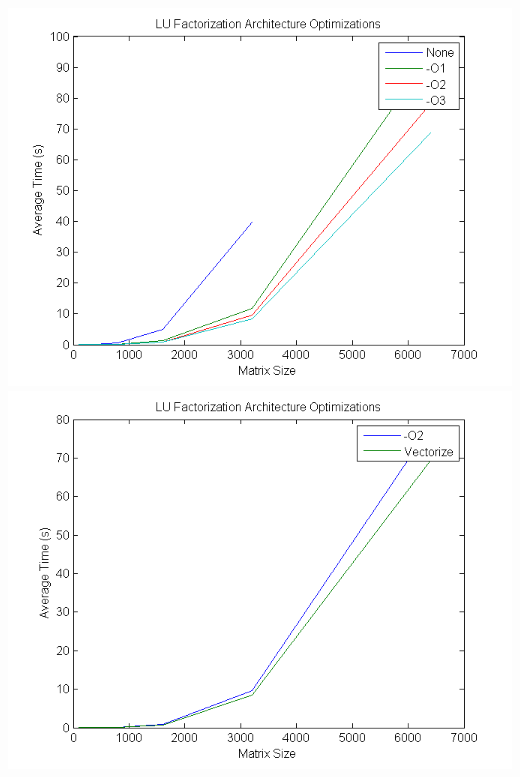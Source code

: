 \documentclass[12]{article}
\begin{document}
\includegraphics[scale=0.5]{figures/fig2}
\includegraphics[scale=0.5]{figures/fig3}
\end{document}

